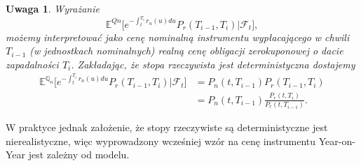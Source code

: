 \documentclass{mini}
\theoremstyle{mythstyle}
\newtheorem{Uwaga}{Uwaga}[chapter]
\begin{document}
\begin{Uwaga}
		Wyrażanie 
			\begin{equation*}
		\mathbb{E}^{Qn} \bigg[ e^{-\int_t^{T_i}r_n(u)du} P_r(T_{i-1},T_i) \bigg| \mathcal{F}_t \bigg],
		\end{equation*}
		możemy interpretować jako cenę nominalną instrumentu wypłacającego w chwili $T_{i-1}$ (w jednostkach nominalnych) realną cenę obligacji zerokuponowej o dacie zapadalności $T_i$. Zakładając, że stopa rzeczywista jest deterministyczna dostajemy
	\begin{align}
	\mathbb{E}^{\mathbb{Q}_n} \bigg[ e^{-\int_t^{T_i}r_n(u)du} P_r(T_{i-1},T_i) \bigg| \mathcal{F}_t \bigg] &= P_n(t,T_{i-1})P_r(T_{i-1},T_i)\\
	&= P_n(t,T_{i-1})\frac{P_r(t,T_i)}{P_r(t,T_{i-1})}.
		\end{align}	
\end{Uwaga}
	W praktyce jednak założenie, że stopy rzeczywiste są deterministyczne jest nierealistyczne, więc wyprowadzony wcześniej wzór na cenę instrumentu Year-on-Year jest zależny od modelu.
\end{document}
